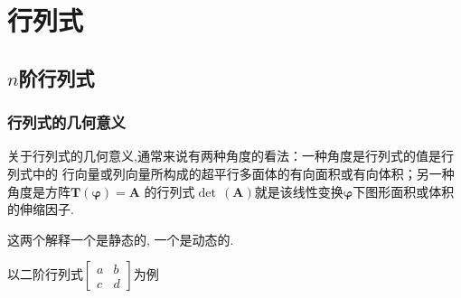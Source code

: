 \newpage
\chapter{行列式}
\thispagestyle{fancy}
\section{\texorpdfstring{$n$}{n}阶行列式}
\subsection{行列式的几何意义}
关于行列式的几何意义,通常来说有两种角度的看法：一种角度是行列式的值是行列式中的
行向量或列向量所构成的超平行多面体的有向面积或有向体积；另一种角度是方阵$\bm{T}\left(\bm{\varphi}\right)=
\bm{A}$
的行列式$\det\,\left(\bm{A}\right)$就是该线性变换$\bm{\varphi}$下图形面积或体积的伸缩因子.

这两个解释一个是静态的,
一个是动态的.

以二阶行列式$\begin{bmatrix}
    a & b\\
    c & d
\end{bmatrix}$为例

